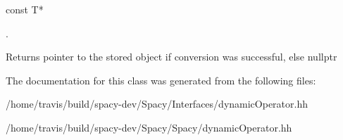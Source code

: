 \begin{DoxyCode}
 const T* 
\end{DoxyCode}
. \begin{DoxyReturn}{\-Returns}
pointer to the stored object if conversion was successful, else nullptr 
\end{DoxyReturn}


\-The documentation for this class was generated from the following files\-:\begin{DoxyCompactItemize}
\item 
/home/travis/build/spacy-\/dev/\-Spacy/\-Interfaces/dynamic\-Operator.\-hh\item 
/home/travis/build/spacy-\/dev/\-Spacy/\-Spacy/dynamic\-Operator.\-hh\end{DoxyCompactItemize}

